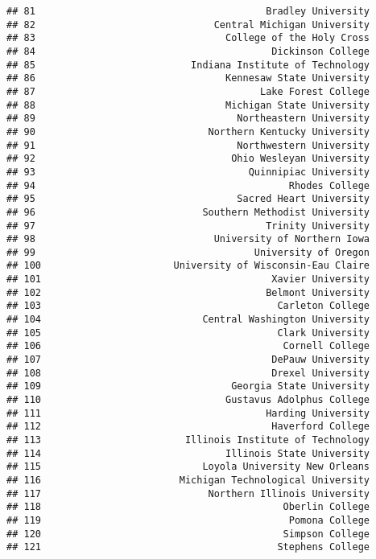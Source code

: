 \documentclass[
]{article}
\begin{document}
\begin{verbatim}
## 81                                        Bradley University
## 82                               Central Michigan University
## 83                                 College of the Holy Cross
## 84                                         Dickinson College
## 85                           Indiana Institute of Technology
## 86                                 Kennesaw State University
## 87                                       Lake Forest College
## 88                                 Michigan State University
## 89                                   Northeastern University
## 90                              Northern Kentucky University
## 91                                   Northwestern University
## 92                                  Ohio Wesleyan University
## 93                                     Quinnipiac University
## 94                                            Rhodes College
## 95                                   Sacred Heart University
## 96                             Southern Methodist University
## 97                                        Trinity University
## 98                               University of Northern Iowa
## 99                                      University of Oregon
## 100                       University of Wisconsin-Eau Claire
## 101                                        Xavier University
## 102                                       Belmont University
## 103                                         Carleton College
## 104                            Central Washington University
## 105                                         Clark University
## 106                                          Cornell College
## 107                                        DePauw University
## 108                                        Drexel University
## 109                                 Georgia State University
## 110                                Gustavus Adolphus College
## 111                                       Harding University
## 112                                        Haverford College
## 113                         Illinois Institute of Technology
## 114                                Illinois State University
## 115                            Loyola University New Orleans
## 116                        Michigan Technological University
## 117                             Northern Illinois University
## 118                                          Oberlin College
## 119                                           Pomona College
## 120                                          Simpson College
## 121                                         Stephens College

\end{verbatim}
\end{document}
